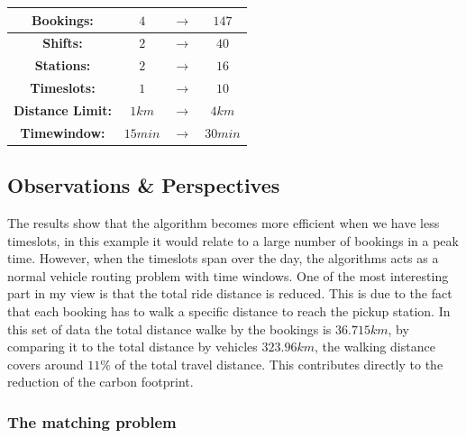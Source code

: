\documentclass{article}
\begin{document}
\begin{center}
 \begin{tabular}{||c c c c||} 
 \hline
 \textbf{Bookings:} & $4$ & $\rightarrow$ & $147$ \\ 
 \hline
 \textbf{Shifts:} & $2$  &$\rightarrow$ & $40$ \\ 
 \hline
 \textbf{Stations:} &  $2$ & $\rightarrow$ &  $16$  \\
 \hline
 \textbf{Timeslots:} & $1$ & $\rightarrow$  & $10$ \\
 \hline
 \textbf{Distance Limit:} & $1km$  & $\rightarrow$  & $4km$  \\
 \hline
 \textbf{Timewindow:} & $15min$ & $\rightarrow$  & $30min$  \\
 \hline
\end{tabular}
\end{center}




\subsection{Observations  \& Perspectives}
The results show that the algorithm becomes more efficient when we have less timeslots, in this example it would relate to a large number of bookings in a peak time. However, when the timeslots span over the day, the algorithms acts as a normal vehicle routing problem with time windows. One of the most interesting part in my view is that the total ride distance is reduced. This is due to the fact that each booking  has to walk a specific distance to reach the pickup station. In this set of data the total distance walke by the bookings is $36.715km$, by comparing it to the total distance by vehicles $323.96km$, the walking distance covers around $11\%$ of the total travel distance. This contributes directly to the reduction of the carbon footprint. 


\subsubsection*{The matching problem}
\label{subsec:matching-prob}
\end{document}
